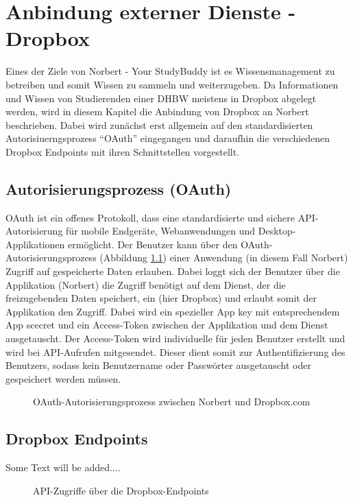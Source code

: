 

\chapter{Anbindung externer Dienste - Dropbox}

Eines der Ziele von Norbert - Your StudyBuddy ist es Wissensmanagement zu betreiben und somit Wissen zu sammeln und weiterzugeben. Da Informationen und Wissen von Studierenden einer DHBW meistens in Dropbox abgelegt werden, wird in diesem Kapitel die Anbindung von Dropbox an Norbert beschrieben. Dabei wird zunächst erst allgemein auf den standardisierten Autorisiuerngsprozess \enquote{OAuth} eingegangen und daraufhin die verschiedenen Dropbox Endpoints mit ihren Schnittstellen vorgestellt.


\section{Autorisierungsprozess (OAuth)}

OAuth ist ein offenes Protokoll, dass eine standardisierte und sichere API-Autorisierung für mobile Endgeräte, Webanwendungen und Desktop-Applikationen ermöglicht. Der Benutzer kann über den OAuth-Autorisierungsprozess (Abbildung \ref{04ergebnis:oauth}) einer Anwendung (in diesem Fall Norbert) Zugriff auf gespeicherte Daten erlauben. Dabei loggt sich der Benutzer über die Applikation (Norbert) die Zugriff benötigt auf dem Dienst, der die freizugebenden Daten speichert, ein (hier Dropbox) und erlaubt somit der Applikation den Zugriff. Dabei wird ein spezieller App key mit entsprechendem App scecret und ein Access-Token zwischen der Applikation und dem Dienst ausgetauscht. Der Access-Token wird individuelle für jeden Benutzer erstellt und wird bei API-Aufrufen mitgesendet. Dieser dient somit zur Authentifizierung des Benutzers, sodass kein Benutzername oder Passwörter ausgetauscht oder gespeichert werden müssen.

\begin{figure}[H]
\centering
	\scalebox{0.5}{}
	\caption{OAuth-Autorisierungsprozess zwischen Norbert und Dropbox.com}
	\label{04ergebnis:oauth}	
\end{figure}


\section{Dropbox Endpoints}

Some Text will be added....

\begin{figure}[H]
\centering
	\scalebox{0.5}{}
	\caption{API-Zugriffe über die Dropbox-Endpoints}
	\label{04ergebnis:dpendpoints}	
\end{figure}